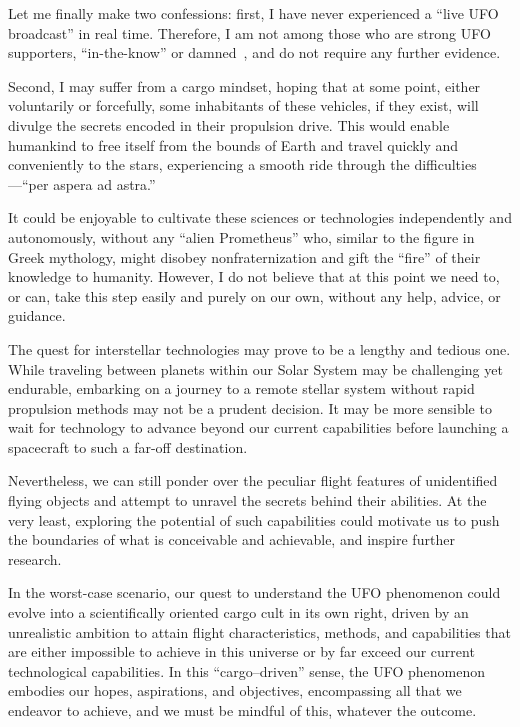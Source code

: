 Let me finally make two confessions: first, I have never experienced a ``live UFO broadcast'' in real time.
Therefore, I am not among those who are strong UFO supporters, ``in-the-know'' or damned~\cite{FortBotD},
and do not require any further evidence.

Second, I may suffer from a cargo mindset, hoping that at some point, either voluntarily or forcefully,
some inhabitants of these vehicles, if they exist, will divulge the secrets encoded in their propulsion drive.
This would enable humankind to free itself from the bounds of Earth and travel quickly and conveniently to the stars,
experiencing a smooth ride through the difficulties---``per aspera ad astra.''

It could be enjoyable to cultivate these sciences or technologies independently and autonomously,
without any ``alien Prometheus'' who, similar to the figure in Greek mythology, might disobey nonfraternization and gift the ``fire''
of their knowledge  to humanity.
However, I do not believe that at this point we need to, or can, take this step easily and purely on our own, without any help, advice, or guidance.

The quest for interstellar technologies may prove to be a lengthy and tedious one.
While traveling between planets within our Solar System may be challenging yet endurable,
embarking on a journey to a remote stellar system without rapid propulsion methods may not be a prudent decision.
It may be more sensible to wait for technology to advance beyond our current capabilities before launching a
spacecraft to such a far-off destination.

Nevertheless, we can still ponder over the peculiar flight features of unidentified flying objects
and attempt to unravel the secrets behind their abilities.
At the very least, exploring the potential of such capabilities could motivate us to push the boundaries of what is conceivable and achievable,
and inspire further research.

In the worst-case scenario, our quest to understand the UFO phenomenon could evolve into a scientifically oriented cargo cult
in its own right, driven by an unrealistic ambition to attain flight characteristics, methods,
and capabilities that are either impossible to achieve in this universe or by far exceed our current technological capabilities.
In this ``cargo--driven'' sense, the UFO phenomenon embodies our hopes, aspirations, and objectives, encompassing all that we endeavor to achieve,
and we must be mindful of this, whatever the outcome.


